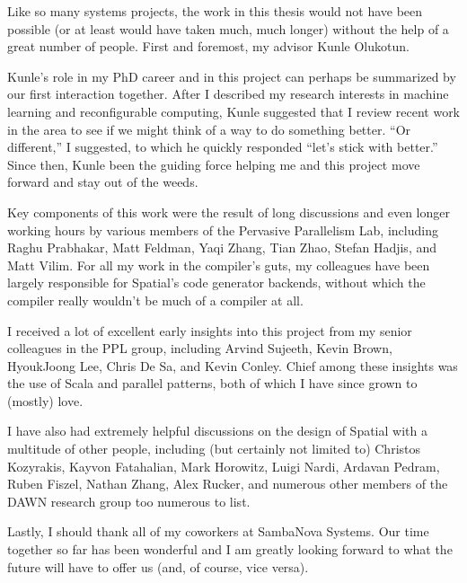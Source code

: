 Like so many systems projects, the work in this thesis would not have been
possible (or at least would have taken much, much longer) without the help of
a great number of people. First and foremost, my advisor Kunle Olukotun.

Kunle's role in my PhD career and in this project can perhaps be summarized by
our
first interaction together. After I described my research interests in machine
learning and reconfigurable computing, Kunle suggested that I review recent
work in the area to see if we might think of a way to do something better.
``Or different,'' I suggested, to which he quickly responded ``let's stick
with better.''  Since then, Kunle been the guiding force helping me and this
project move forward and stay out of the weeds.

Key components of this work were the result of long discussions and even longer
working hours by various members of the Pervasive Parallelism Lab, including
Raghu Prabhakar, Matt Feldman, Yaqi Zhang, Tian Zhao, Stefan Hadjis, and Matt
Vilim. For all my work in the compiler's guts, my colleagues have been largely
responsible for Spatial's code generator backends, without which the
compiler really wouldn't be much of a compiler at all.

I received a lot of excellent early insights into this project from my senior
colleagues in the PPL group, including Arvind Sujeeth, Kevin Brown, HyoukJoong
Lee, Chris De Sa, and Kevin Conley. Chief among these insights was the use of
Scala and parallel patterns, both of which I have since grown to (mostly) love.

I have also had extremely helpful discussions on the design of Spatial
with a multitude of other people, including (but certainly not limited to)
Christos Kozyrakis, Kayvon Fatahalian, Mark Horowitz,
Luigi Nardi, Ardavan Pedram, Ruben Fiszel, Nathan Zhang, Alex Rucker, and
numerous other members of the DAWN research group too numerous to list.

Lastly, I should thank all of my coworkers at SambaNova Systems. Our time
together so far has been wonderful and I am greatly looking forward to what
the future will have to offer us (and, of course, vice versa).
